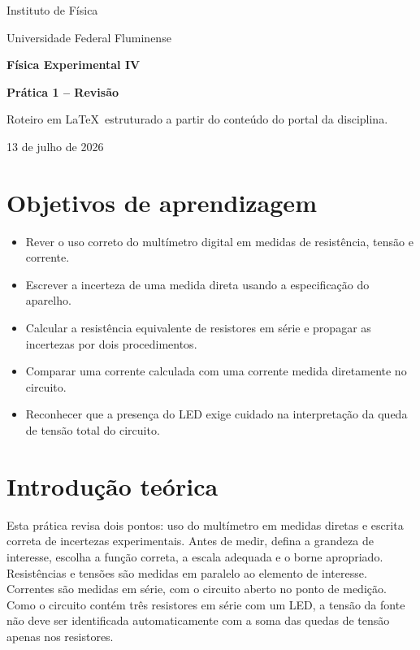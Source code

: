 \documentclass[12pt,a4paper]{article}
\newcommand{\instituicao}{Universidade Federal Fluminense}
\newcommand{\unidade}{Instituto de Física}
\newcommand{\disciplina}{Física Experimental IV}
\begin{document}
\begin{titlepage}
  \centering
  {\Large \unidade \par}
  \vspace{0.4cm}
  {\large \instituicao \par}
  \vfill
  {\LARGE\bfseries \disciplina \par}
  \vspace{0.8cm}
  {\Huge\bfseries Prática 1 -- Revisão \par}
  \vspace{0.8cm}
  {\large Roteiro em \LaTeX\ estruturado a partir do conteúdo do portal da disciplina.\par}
  \vfill
  {\large 13 de julho de 2026 \par}
\end{titlepage}

\tableofcontents
\newpage

\section{Objetivos de aprendizagem}

\begin{itemize}
  \item Rever o uso correto do multímetro digital em medidas de resistência, tensão e corrente.
  \item Escrever a incerteza de uma medida direta usando a especificação do aparelho.
  \item Calcular a resistência equivalente de resistores em série e propagar as incertezas por dois procedimentos.
  \item Comparar uma corrente calculada com uma corrente medida diretamente no circuito.
  \item Reconhecer que a presença do LED exige cuidado na interpretação da queda de tensão total do circuito.
\end{itemize}

\section{Introdução teórica}

Esta prática revisa dois pontos: uso do multímetro em medidas diretas e escrita correta de incertezas experimentais. Antes de medir,
defina a grandeza de interesse, escolha a função correta, a escala adequada e o borne apropriado. Resistências e tensões são medidas
em paralelo ao elemento de interesse. Correntes são medidas em série, com o circuito aberto no ponto de medição. Como o circuito
contém três resistores em série com um LED, a tensão da fonte não deve ser identificada automaticamente com a soma das quedas de
tensão apenas nos resistores.
\end{document}
